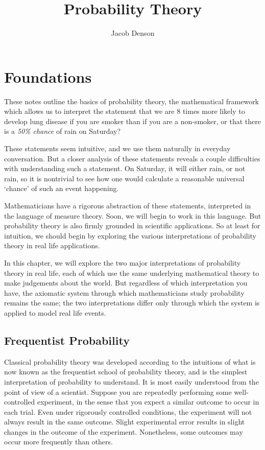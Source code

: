 

\title{Probability Theory}
\author{Jacob Denson}



\maketitle
\tableofcontents
{}

\chapter{Foundations}

These notes outline the basics of probability theory, the mathematical framework which allows us to interpret the statement that we are 8 times more likely to develop lung disease if you are smoker than if you are a non-smoker, or that there is a {\it 50\% chance} of rain on Saturday?

These statements seem intuitive, and we use them naturally in everyday conversation. But a closer analysis of these statements reveals a couple difficulties with understanding such a statement. On Saturday, it will either rain, or not rain, so it is nontrivial to see how one would calculate a reasonable universal `chance' of such an event happening.

Mathematicians have a rigorous abstraction of these statements, interpreted in the language of measure theory. Soon, we will begin to work in this language. But probability theory is also firmly grounded in scientific applications. So at least for intuition, we should begin by exploring the various interpretations of probability theory in real life applications.

In this chapter, we will explore the two major interpretations of probability theory in real life, each of which use the same underlying mathematical theory to make judgements about the world. But regardless of which interpretation you have, the axiomatic system through which mathematicians study probability remains the same; the two interpretations differ only through which the system is applied to model real life events.

\section{Frequentist Probability}

Classical probability theory was developed according to the intuitions of what is now known as the frequentist school of probability theory, and is the simplest interpretation of probability to understand. It is most easily understood from the point of view of a scientist. Suppose you are repeatedly performing some well-controlled experiment, in the sense that you expect a similar outcome to occur in each trial. Even under rigorously controlled conditions, the experiment will not always result in the same outcome. Slight experimental error results in slight changes in the outcome of the experiment. Nonetheless, some outcomes may occur more frequently than others.

